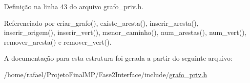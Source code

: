 Definição na linha 43 do arquivo grafo\+\_\+priv.\+h.



Referenciado por criar\+\_\+grafo(), existe\+\_\+aresta(), inserir\+\_\+aresta(), inserir\+\_\+origem(), inserir\+\_\+vert(), menor\+\_\+caminho(), num\+\_\+arestas(), num\+\_\+vert(), remover\+\_\+aresta() e remover\+\_\+vert().



A documentação para esta estrutura foi gerada a partir do seguinte arquivo\+:\begin{DoxyCompactItemize}
\item 
/home/rafael/\+Projeto\+Final\+M\+P/\+Fase2\+Interface/include/\hyperlink{grafo__priv_8h}{grafo\+\_\+priv.\+h}\end{DoxyCompactItemize}
